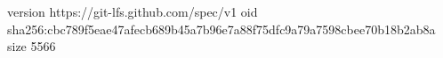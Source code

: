 version https://git-lfs.github.com/spec/v1
oid sha256:cbc789f5eae47afecb689b45a7b96e7a88f75dfc9a79a7598cbee70b18b2ab8a
size 5566
